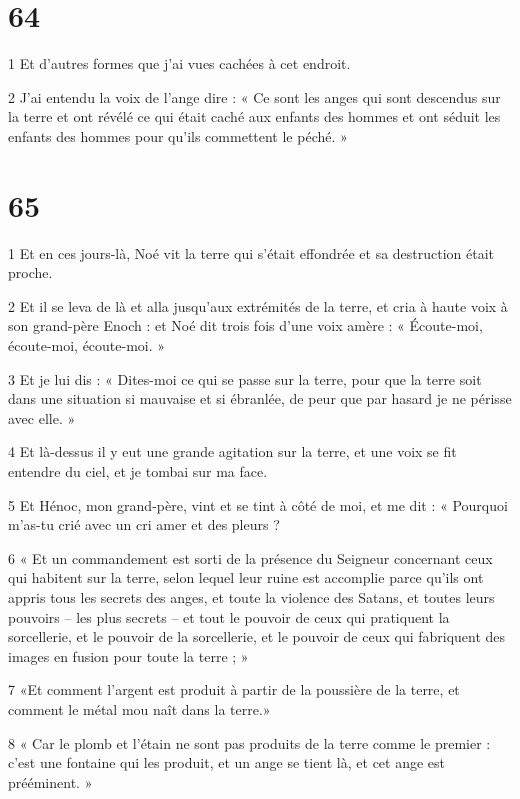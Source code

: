 \chapter{64}

\par 1 Et d'autres formes que j'ai vues cachées à cet endroit.
\par 2 J'ai entendu la voix de l'ange dire : « Ce sont les anges qui sont descendus sur la terre et ont révélé ce qui était caché aux enfants des hommes et ont séduit les enfants des hommes pour qu'ils commettent le péché. »

\chapter{65}

\par 1 Et en ces jours-là, Noé vit la terre qui s'était effondrée et sa destruction était proche.
\par 2 Et il se leva de là et alla jusqu'aux extrémités de la terre, et cria à haute voix à son grand-père Enoch : et Noé dit trois fois d'une voix amère : « Écoute-moi, écoute-moi, écoute-moi. »
\par 3 Et je lui dis : « Dites-moi ce qui se passe sur la terre, pour que la terre soit dans une situation si mauvaise et si ébranlée, de peur que par hasard je ne périsse avec elle. »
\par 4 Et là-dessus il y eut une grande agitation sur la terre, et une voix se fit entendre du ciel, et je tombai sur ma face.
\par 5 Et Hénoc, mon grand-père, vint et se tint à côté de moi, et me dit : « Pourquoi m'as-tu crié avec un cri amer et des pleurs ?
\par 6 « Et un commandement est sorti de la présence du Seigneur concernant ceux qui habitent sur la terre, selon lequel leur ruine est accomplie parce qu'ils ont appris tous les secrets des anges, et toute la violence des Satans, et toutes leurs pouvoirs – les plus secrets – et tout le pouvoir de ceux qui pratiquent la sorcellerie, et le pouvoir de la sorcellerie, et le pouvoir de ceux qui fabriquent des images en fusion pour toute la terre ; »
\par 7 «Et comment l'argent est produit à partir de la poussière de la terre, et comment le métal mou naît dans la terre.»
\par 8 « Car le plomb et l'étain ne sont pas produits de la terre comme le premier : c'est une fontaine qui les produit, et un ange se tient là, et cet ange est prééminent. »
